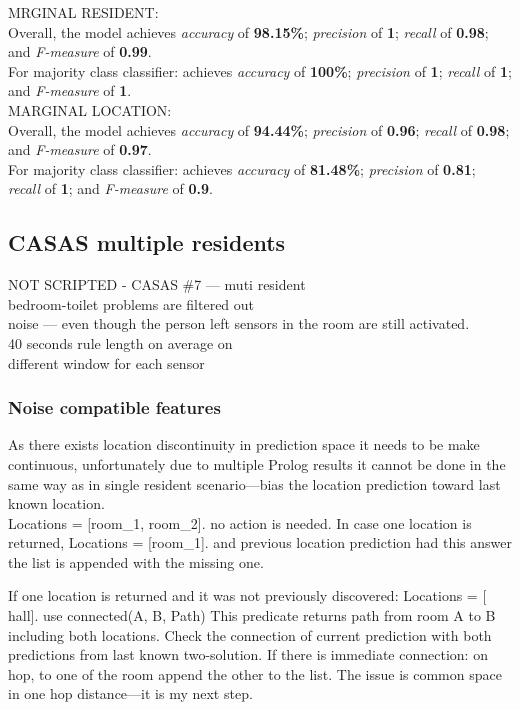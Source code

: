 \documentclass[10pt, a4paper, pdflatex, leqno, twoside, openright]{report}
\begin{document}
MRGINAL RESIDENT:\\
Overall, the model achieves \emph{accuracy} of \textbf{98.15\%}; \emph{precision} of \textbf{1}; \emph{recall} of \textbf{0.98}; and \emph{F-measure} of \textbf{0.99}.\\
For majority class classifier: achieves \emph{accuracy} of \textbf{100\%}; \emph{precision} of \textbf{1}; \emph{recall} of \textbf{1}; and \emph{F-measure} of \textbf{1}.\\

MARGINAL LOCATION:\\
Overall, the model achieves \emph{accuracy} of \textbf{94.44\%}; \emph{precision} of \textbf{0.96}; \emph{recall} of \textbf{0.98}; and \emph{F-measure} of \textbf{0.97}.\\
For majority class classifier: achieves \emph{accuracy} of \textbf{81.48\%}; \emph{precision} of \textbf{0.81}; \emph{recall} of \textbf{1}; and \emph{F-measure} of \textbf{0.9}.

    \subsection{CASAS multiple residents}
NOT SCRIPTED - CASAS \#7 --- muti resident\\
bedroom-toilet problems are filtered out\\
noise --- even though the person left sensors in the room are still activated.\\
40 seconds rule length on average on\\
different window for each sensor\\

      \subsubsection{Noise compatible features}
As there exists location discontinuity in prediction space it needs to be make continuous, unfortunately due to multiple Prolog results it cannot be done in the same way as in single resident scenario—bias the location prediction toward last known location.\\

Locations = [room\_1, room\_2].
no action is needed. In case one location is returned,
Locations = [room\_1].
and previous location prediction had this answer the list is appended with the missing one.

If one location is returned and it was not previously discovered:
Locations = [ hall].
use
connected(A, B, Path)
This predicate returns path from room A to B including both locations. Check the connection of current prediction with both predictions from last known two-solution. If there is immediate connection: on hop, to one of the room append the other to the list. The issue is common space in one hop distance---it is my next step.
\end{document}
